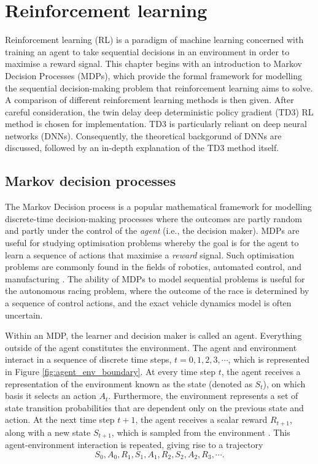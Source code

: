 \chapter{Reinforcement learning}\label{chp:rl}


Reinforcement learning (RL) is a paradigm of machine learning concerned with training an agent to take sequential decisions in an environment in order to maximise a reward signal.
This chapter begins with an introduction to Markov Decision Processes (MDPs), which provide the formal framework for modelling the sequential decision-making problem that reinforcement learning aims to solve.
A comparison of different reinforcment learning methods is then given.
After careful consideration, the twin delay deep deterministic policy gradient (TD3) RL method is chosen for implementation.
TD3 is particularly reliant on deep neural networks (DNNs). 
Consequently, the theoretical backgorund of DNNs are discussed, followed by an in-depth explanation of the TD3 method itself.


\section{Markov decision processes}\label{sec:mdps}

The Markov Decision process is a popular mathematical framework for modelling discrete-time decision-making processes where the outcomes are partly random and partly under the control of the \emph{agent} (i.e., the decision maker).
MDPs are useful for studying optimisation problems whereby the goal is for the agent to learn a sequence of actions that maximise a \emph{reward} signal.
Such optimisation problems are commonly found in the fields of robotics, automated control, and manufacturing \cite{White1985}.
The ability of MDPs to model sequential problems is useful for the autonomous racing problem, where the outcome of the race is determined by a sequence of control actions, and the exact vehicle dynamics model is often uncertain.



Within an MDP, the learner and decision maker is called an agent.
Everything outside of the agent constitutes the environment.
The agent and environment interact in a sequence of discrete time steps, $t=0,1,2,3, \cdots$, which is represented in Figure \ref{fig:agent_env_boundary}.
At every time step $t$, the agent receives a  representation of the environment known as the state (denoted as $S_t$), on which basis it selects an action $A_t$.
Furthermore, the environment represents a set of state transition probabilities that are dependent only on the previous state and action.
At the next time step $t+1$, the agent receives a scalar reward $R_{t+1}$, along with a new state $S_{t+1}$, which is sampled from the environment \cite{sutton2020}.
This agent-environment interaction is repeated, giving rise to a trajectory
\begin{equation}\label{eq:mdp_trajectory}
S_0, A_0, R_1, S_1, A_1, R_2, S_2, A_2, R_3, \cdots.
\end{equation}


